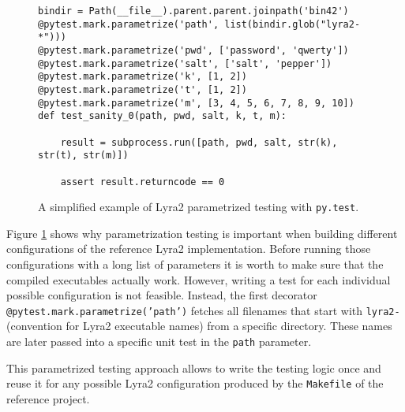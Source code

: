 \begin{figure}
\begin{verbatim}
bindir = Path(__file__).parent.parent.joinpath('bin42')
@pytest.mark.parametrize('path', list(bindir.glob("lyra2-*")))
@pytest.mark.parametrize('pwd', ['password', 'qwerty'])
@pytest.mark.parametrize('salt', ['salt', 'pepper'])
@pytest.mark.parametrize('k', [1, 2])
@pytest.mark.parametrize('t', [1, 2])
@pytest.mark.parametrize('m', [3, 4, 5, 6, 7, 8, 9, 10])
def test_sanity_0(path, pwd, salt, k, t, m):

    result = subprocess.run([path, pwd, salt, str(k), str(t), str(m)])

    assert result.returncode == 0
\end{verbatim}
\caption{A simplified example of Lyra2 parametrized testing with \texttt{py.test}.}
\label{fig:pytest-parametrization}
\end{figure}

Figure \ref{fig:pytest-parametrization} shows why parametrization testing is important when building different configurations of the reference Lyra2 implementation. Before running those configurations with a long list of parameters it is worth to make sure that the compiled executables actually work. However, writing a test for each individual possible configuration is not feasible. Instead, the first decorator \texttt{@pytest.mark.parametrize('path')} fetches all filenames that start with \texttt{lyra2-} (convention for Lyra2 executable names) from a specific directory. These names are later passed into a specific unit test in the \texttt{path} parameter.

This parametrized testing approach allows to write the testing logic once and reuse it for any possible Lyra2 configuration produced by the \texttt{Makefile} of the reference project.
